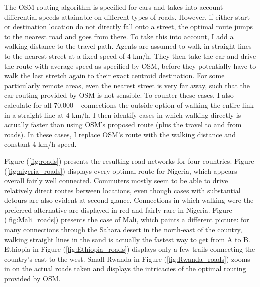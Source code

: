 \documentclass[11pt, oneside]{article}   	%
\let\oldref\ref
\renewcommand{\ref}[1]{(\oldref{#1})}
\begin{document}
The OSM routing algorithm is specified for cars and takes into account differential speeds attainable on different types of roads. However, if either start or destination location do not directly fall onto a street, the optimal route jumps to the nearest road and goes from there. To take this into account, I add a walking distance to the travel path. Agents are assumed to walk in straight lines to the nearest street at a fixed speed of 4 km/h. They then take the car and drive the route with average speed as specified by OSM, before they potentially have to walk the last stretch again to their exact centroid destination. For some particularly remote areas, even the nearest street is very far away, such that the car routing provided by OSM is not sensible. To counter these cases, I also calculate for all 70,000+ connections the outside option of walking the entire link in a straight line at 4 km/h. I then identify cases in which walking directly is actually faster than using OSM's proposed route (plus the travel to and from roads). In these cases, I replace OSM's route with the walking distance and constant 4 km/h speed.

Figure \ref{fig:roads} presents the resulting road networks for four countries. Figure \ref{fig:nigeria_roads} displays every optimal route for Nigeria, which appears overall fairly well connected. Commuters mostly seem to be able to drive relatively direct routes between locations, even though cases with substantial detours are also evident at second glance. Connections in which walking were the preferred alternative are displayed in red and fairly rare in Nigeria. Figure \ref{fig:Mali_roads} presents the case of Mali, which paints a different picture: for many connections through the Sahara desert in the north-east of the country, walking straight lines in the sand is actually the fastest way to get from A to B. Ethiopia in Figure \ref{fig:Ethiopia_roads} displays only a few trails connecting the country's east to the west. Small Rwanda in Figure \ref{fig:Rwanda_roads} zooms in on the actual roads taken and displays the intricacies of the optimal routing provided by OSM.
\end{document}
